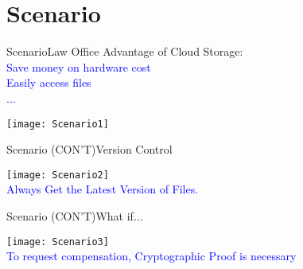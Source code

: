 \section{Scenario}

\begin{frame}{Scenario}{Law Office}
	\alert{Advantage of Cloud Storage:}\\
	\textcolor{blue}{
		\hspace{.1\textwidth}Save money on hardware cost\\
		\hspace{.1\textwidth}Easily access files\\
		\hspace{.1\textwidth}...
	}
	\begin{center}
		\texttt{[image: Scenario1]}
	\end{center}
\end{frame}

\begin{frame}{Scenario (CON'T)}{Version Control}
	\begin{center}
		\texttt{[image: Scenario2]}\\
		\textcolor{blue}{Always Get the Latest Version of Files.}
	\end{center}
\end{frame}

\begin{frame}{Scenario (CON'T)}{What if...}
	\begin{center}
		\texttt{[image: Scenario3]}\\
		\textcolor{blue}{To request compensation, \alert{Cryptographic Proof} is necessary}
	\end{center}
\end{frame}